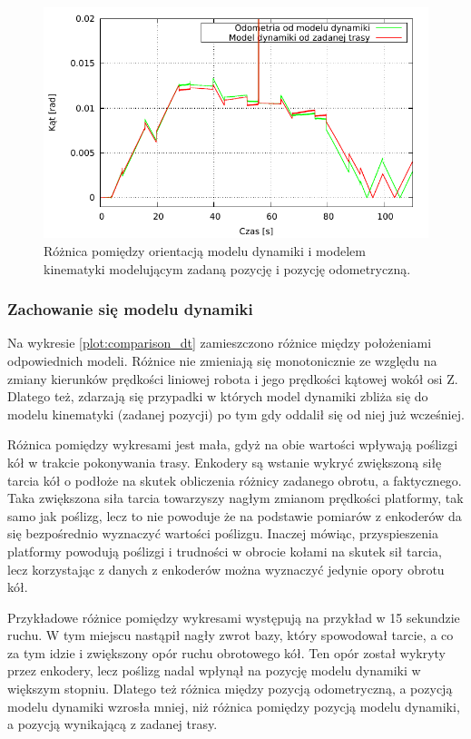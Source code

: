 			\begin{figure}[h]
				\centering
				\includegraphics[width=\textwidth]{plots/comparison_at.pdf}
					\caption{Różnica pomiędzy orientacją modelu dynamiki i modelem kinematyki modelującym zadaną pozycję i pozycję odometryczną.}
				\label{plot:comparison_at}
			\end{figure}
			
		\subsubsection{Zachowanie się modelu dynamiki}
			Na wykresie \ref{plot:comparison_dt} zamieszczono różnice między położeniami odpowiednich modeli.
			Różnice nie zmieniają się monotonicznie ze względu na zmiany kierunków prędkości liniowej robota i jego prędkości kątowej wokół osi Z.
			Dlatego też, zdarzają się przypadki w których model dynamiki zbliża się do modelu kinematyki (zadanej pozycji) po tym gdy oddalił się od niej już wcześniej.
			
			Różnica pomiędzy wykresami jest mała, gdyż na obie wartości wpływają poślizgi kół w trakcie pokonywania trasy.
			Enkodery są wstanie wykryć zwiększoną siłę tarcia kół o podłoże na skutek obliczenia różnicy zadanego obrotu, a faktycznego.
			Taka zwiększona siła tarcia towarzyszy nagłym zmianom prędkości platformy, tak samo jak poślizg, lecz to nie powoduje że na
			podstawie pomiarów z enkoderów da się bezpośrednio wyznaczyć wartości poślizgu.
			Inaczej mówiąc, przyspieszenia platformy powodują poślizgi i trudności w obrocie kołami na skutek sił tarcia, lecz korzystając z danych z enkoderów można wyznaczyć
			jedynie opory obrotu kół.
			
			Przykładowe różnice pomiędzy wykresami występują na przykład w 15 sekundzie ruchu. 
			W tym miejscu nastąpił nagły zwrot bazy, który spowodował tarcie, a co za tym idzie i zwiększony opór ruchu obrotowego kół.
			Ten opór został wykryty przez enkodery, lecz poślizg nadal wpłynął na pozycję modelu dynamiki w większym stopniu.
			Dlatego też różnica między pozycją odometryczną, a pozycją modelu dynamiki wzrosła mniej, niż różnica pomiędzy pozycją modelu dynamiki, a pozycją wynikającą z zadanej trasy.
			
